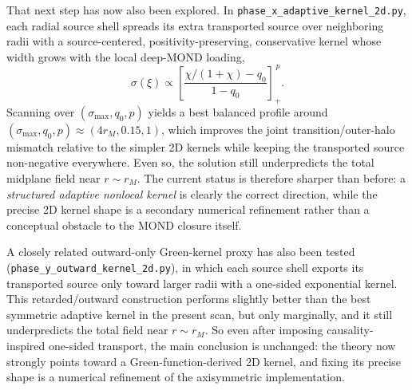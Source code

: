 \documentclass[11pt]{article}
\begin{document}
That next step has now also been explored.  In
\nolinkurl{phase_x_adaptive_kernel_2d.py}, each radial source shell spreads
its extra transported source over neighboring radii with a
source-centered, positivity-preserving, conservative kernel whose width grows
with the local deep-MOND loading,
\[
\sigma(\xi)\propto
\left[\frac{\chi/(1+\chi)-q_0}{1-q_0}\right]_+^{\,p}.
\]
Scanning over $(\sigma_{\max},q_0,p)$ yields a best balanced profile around
$(\sigma_{\max},q_0,p)\approx(4r_M,0.15,1)$, which improves the joint
transition/outer-halo mismatch relative to the simpler 2D kernels while
keeping the transported source non-negative everywhere.  Even so, the solution
still underpredicts the total midplane field near $r\sim r_M$.  The current
status is therefore sharper than before: a \emph{structured adaptive nonlocal
kernel} is clearly the correct direction, while the precise 2D kernel shape is
a secondary numerical refinement rather than a conceptual obstacle to the
MOND closure itself.

A closely related outward-only Green-kernel proxy has also been tested
(\nolinkurl{phase_y_outward_kernel_2d.py}), in which each source shell exports
its transported source only toward larger radii with a one-sided exponential
kernel.  This retarded/outward construction performs slightly better than the
best symmetric adaptive kernel in the present scan, but only marginally, and
it still underpredicts the total field near $r\sim r_M$.  So even after
imposing causality-inspired one-sided transport, the main conclusion is
unchanged: the theory now strongly points toward a Green-function-derived 2D
kernel, and fixing its precise shape is a numerical refinement of the
axisymmetric implementation.
\end{document}
